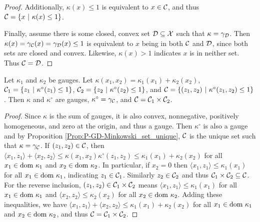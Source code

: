 \begin{enumerate}
\begin{proof}
Additionally, $\kappa(x) \leq 1$ is equivalent to $x \in {\mathcal C}$, and thus ${\mathcal C} =  \{ x \ | \ \kappa(x) \leq 1 \}$.

Finally, assume there is some closed, convex set ${\mathcal D} \subseteq {\mathcal X}$ such that $\kappa = \gamma_{\mathcal D}$.  Then $\kappa(x) = \gamma_{\mathcal C}(x) = \gamma_{\mathcal D}(x) \leq 1$ is equivalent to $x$ being in both ${\mathcal C}$ and ${\mathcal D}$, since both sets are closed and convex. Likewise, $\kappa(x) > 1$ indicates $x$ is in neither set.  Thus ${\mathcal C} = {\mathcal D}$.

\end{proof}

\begin{prop} 			\label{Prop:P-GD-polar_of_sum_of_gauges_sets_equal}
Let $\kappa_1$ and $\kappa_2$ be gauges.  Let $\kappa(x_1, x_2) = \kappa_1(x_1) + \kappa_2(x_2)$, ${\mathcal C}_1 = \{ z_1 \ | \ \kappa^\circ(z_1) \leq 1 \}$, $\caC_2 = \{ z_2 \ | \ \kappa^\circ(z_2) \leq 1 \}$, and ${\mathcal C} = \{ (z_1, z_2) \ | \ \kappa^\circ(z_1, z_2) \leq 1 \}$. Then $\kappa$ and $\kappa^\circ$ are gauges, $\kappa^\circ = \gamma_{\mathcal C}$, and ${\mathcal C} = {\mathcal C}_1 \times {\mathcal C}_2$.
\end{prop}
\begin{proof}
Since $\kappa$ is the sum of gauges, it is also convex, nonnegative, positively homogeneous, and zero at the origin, and thus a gauge.  Then $\kappa^\circ$ is also a gauge and by Proposition \ref{Prop:P-GD-Minkowski_set_unique}, ${\mathcal C}$ is the unique set such that $\kappa = \gamma_{\mathcal C}$.
If $(z_1, z_2) \in {\mathcal C}$, then $\langle x_1, z_1 \rangle + \langle x_2, z_2 \rangle \leq \kappa(x_1,x_2)\kappa^\circ(z_1,z_2) \leq  \kappa_1(x_1) + \kappa_2 (x_2)$ for all $x_1 \in \textnormal{dom}\ \kappa_1$ and $x_2 \in \textnormal{dom} \ \kappa_2$.  In particular, if $x_2 = 0$ then $\langle x_1, z_1 \rangle \leq \kappa_1(x_1)$ for all $x_1  \in \textnormal{dom}\ \kappa_1$, indicating $z_1 \in {\mathcal C}_1$.  Similarly $z_2 \in {\mathcal C}_2$ and thus ${\mathcal C}_1 \times {\mathcal C}_2 \subseteq {\mathcal C}$.  For the reverse inclusion, $(z_1, z_2) \in {\mathcal C}_1 \times {\mathcal C}_2$ means $\langle x_1, z_1 \rangle \leq \kappa_1(x_1)$ for all $x_1 \in \textnormal{dom}\ \kappa_1$ and $\langle x_2, z_2 \rangle \leq \kappa_2(x_2)$ for all $x_2 \in \textnormal{dom}\ \kappa_2$.  Adding these inequalities, we have $\langle x_1, z_1 \rangle + \langle x_2, z_2 \rangle \leq \kappa_1(x_1) + \kappa_2 (x_2)$ for all $x_1 \in \textnormal{dom}\ \kappa_1$ and $x_2  \in \textnormal{dom}\ \kappa_2$, and thus ${\mathcal C} = {\mathcal C}_1 \times {\mathcal C}_2$.
\end{proof}



\end{enumerate}
